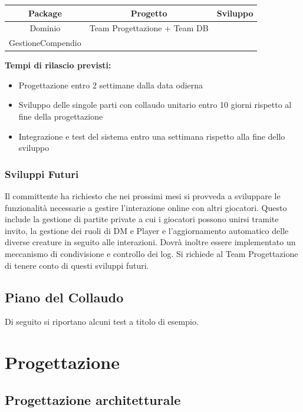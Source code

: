 \documentclass[a4paper, 11pt]{article}
\begin{document}
\vspace{2em}

\begin{center}
    \begin{tabular}{|c|c|c|}
        \hline
        \textbf{Package} & \textbf{Progetto} & \textbf{Sviluppo} \\\hline
        Dominio & Team Progettazione + Team DB &  \\\hline
        GestioneCompendio &&\\
        \hline
    \end{tabular}
\end{center}
\vspace{2em}
\textbf{Tempi di rilascio previsti:}
\begin{itemize}
    \item Progettazione entro 2 settimane dalla data odierna
    \item Sviluppo delle singole parti con collaudo unitario entro 10 giorni rispetto al fine della progettazione
    \item Integrazione e test del sistema entro una settimana rispetto alla fine dello sviluppo
\end{itemize}

\subsubsection{Sviluppi Futuri}
Il committente ha richiesto che nei prossimi mesi si provveda a sviluppare le funzionalità necessarie a gestire l'interazione online con altri giocatori. Questo include la gestione di partite private a cui i giocatori possono unirsi tramite invito, la gestione dei ruoli di DM e Player e l'aggiornamento automatico delle diverse creature in seguito alle interazioni. Dovrà inoltre essere implementato un meccanismo di condivisione e controllo dei log.
Si richiede al Team Progettazione di tenere conto di questi sviluppi futuri.

\clearpage \newpage
\subsection{Piano del Collaudo}
Di seguito si riportano alcuni test a titolo di esempio.

\newpage
\section{Progettazione}
\subsection{Progettazione architetturale}
\end{document}
